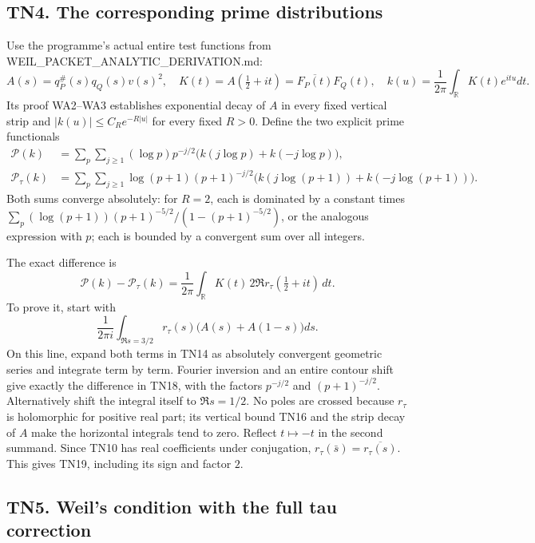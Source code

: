 \documentclass[
  10pt,
  a4paper,
]{article}
\begin{document}
\subsection{TN4. The corresponding prime
distributions}\label{tn4.-the-corresponding-prime-distributions}

Use the programme's actual entire test functions from
WEIL\_PACKET\_ANALYTIC\_DERIVATION.md: \[
A(s)=q_P^\#(s)q_Q(s)v(s)^2,\quad
K(t)=A(\tfrac12+it)=\overline{F_P(t)}F_Q(t),\quad
k(u)=\frac1{2\pi}\int_{\mathbb R}K(t)e^{itu}dt.
\tag{TN17}
\] Its proof WA2--WA3 establishes exponential decay of \(A\) in every
fixed vertical strip and \(|k(u)|\le C_R e^{-R|u|}\) for every fixed
\(R>0\). Define the two explicit prime functionals \[
\begin{aligned}
\mathcal P(k)&=\sum_p\sum_{j\ge1}(\log p)p^{-j/2}
\bigl(k(j\log p)+k(-j\log p)\bigr),\\
\mathcal P_\tau(k)&=\sum_p\sum_{j\ge1}\log(p+1)(p+1)^{-j/2}
\bigl(k(j\log(p+1))+k(-j\log(p+1))\bigr).
\end{aligned}
\tag{TN18}
\] Both sums converge absolutely: for \(R=2\), each is dominated by a
constant times \(\sum_p(\log(p+1))(p+1)^{-5/2}/(1-(p+1)^{-5/2})\), or
the analogous expression with \(p\); each is bounded by a convergent sum
over all integers.

The exact difference is \[
\boxed{\mathcal P(k)-\mathcal P_\tau(k)
=\frac1{2\pi}\int_{\mathbb R}K(t)
\,2\Re r_\tau(\tfrac12+it)\,dt.}
\tag{TN19}
\] To prove it, start with \[
\frac1{2\pi i}\int_{\Re s=3/2}
r_\tau(s)\bigl(A(s)+A(1-s)\bigr)ds.
\] On this line, expand both terms in TN14 as absolutely convergent
geometric series and integrate term by term. Fourier inversion and an
entire contour shift give exactly the difference in TN18, with the
factors \(p^{-j/2}\) and \((p+1)^{-j/2}\). Alternatively shift the
integral itself to \(\Re s=1/2\). No poles are crossed because
\(r_\tau\) is holomorphic for positive real part; its vertical bound
TN16 and the strip decay of \(A\) make the horizontal integrals tend to
zero. Reflect \(t\mapsto-t\) in the second summand. Since TN10 has real
coefficients under conjugation, \(r_\tau(\bar s)=\overline{r_\tau(s)}\).
This gives TN19, including its sign and factor \(2\).

\subsection{TN5. Weil's condition with the full tau
correction}\label{tn5.-weils-condition-with-the-full-tau-correction}
\end{document}
